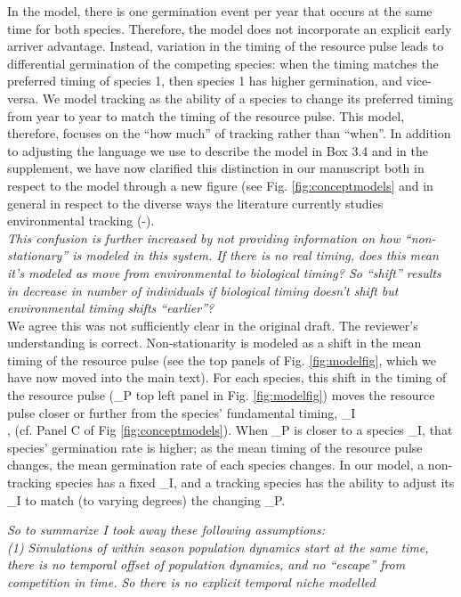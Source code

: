 \documentclass[11pt]{article}
\begin{document}
In the model, there is one germination event per year that occurs at the same time for both species.  Therefore, the model does not incorporate an explicit early arriver advantage.  Instead, variation in the timing of the resource pulse leads to differential germination of the competing species: when the timing matches the preferred timing of species 1, then species 1 has higher germination, and vice-versa.  We model tracking as the ability of a species to change its preferred timing from year to year to match the timing of the resource pulse.  This model, therefore, focuses on the ``how much'' of tracking rather than ``when''.  In addition to adjusting the language we use to describe the model in Box 3.4 and in the supplement,  we have now clarified this distinction in our manuscript both in respect to the model through a new figure (see Fig. \ref{fig:conceptmodels} and in general in respect to the diverse ways the literature currently studies environmental tracking (-).\\ 

\emph{This confusion is further increased by not providing information on how ``non-stationary'' is
modeled in this system. If there is no real timing, does this mean it's modeled as move from
environmental to biological timing? So ``shift'' results in decrease in number of individuals
if biological timing doesn't shift but environmental timing shifts “earlier”?}\\

We agree this was not sufficiently clear in the original draft.  The reviewer's understanding is correct.  Non-stationarity is modeled as a shift in the mean timing of the resource pulse (see the top panels of Fig. \ref{fig:modelfig}, which we have now moved into the main text).  For each species, this shift in the timing of the resource pulse (\tau_P top left panel in Fig. \ref{fig:modelfig}) moves the resource pulse closer or further from the species' fundamental timing, \tau_I\\, (cf. Panel C of Fig \ref{fig:conceptmodels}).  When \tau_P is closer to a species \tau_I, that species' germination rate is higher; as the mean timing of the resource pulse changes, the mean germination rate of each species changes.  In our model, a non-tracking species has a fixed \tau_I, and a tracking species has the ability to adjust its \tau_I to match (to varying degrees) the changing \tau_P.  

\emph{So to summarize I took away these following assumptions:\\
(1)     Simulations of within season population dynamics start at the same time, there is no
temporal offset of population dynamics, and no ``escape'' from competition in time. So there is
no explicit temporal niche modelled}\\
\end{document}
